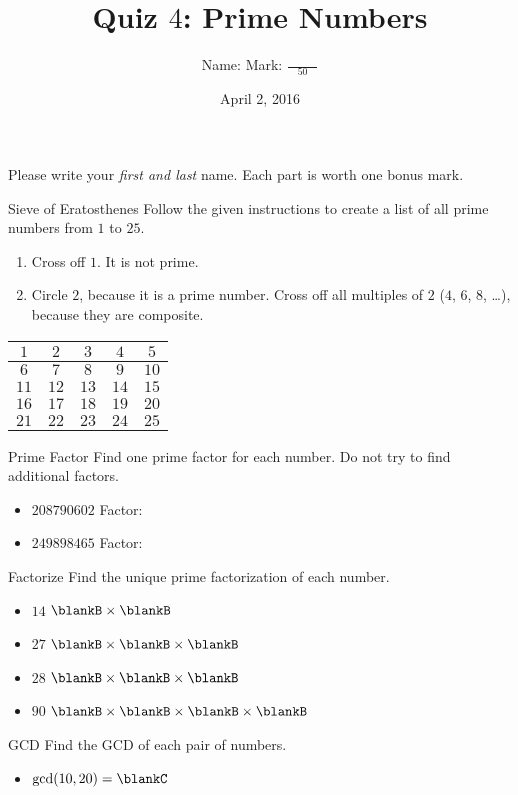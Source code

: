 \documentclass[12pt,letterpaper]{article}
\title{Quiz $4$: Prime Numbers}
\author{Name: \underline{\hspace{5cm}} Mark: $\displaystyle \frac{\hspace{3em}}{50}$}
\date{April 2, 2016}
\begin{document}
\maketitle

Please write your \emph{first and last} name. Each part is worth one bonus mark.

\thispagestyle{empty}

\begin{problem}{Sieve of Eratosthenes}
 Follow the given instructions to create a list of all prime numbers from $1$
 to $25$.

 \begin{enumerate}
  \item Cross off $1$. It is not prime.
  \item Circle $2$, because it is a prime number. Cross off all multiples of $2$
  ($4$, $6$, $8$, \dots), because they are composite.
 \end{enumerate}

 \begin{center}
  \begin{tabular}{|c|c|c|c|c|}
   \hline
   $1$ & $2$ & $3$ & $4$ & $5$ \\
   \hline
   $6$ & $7$ & $8$ & $9$ & $10$ \\
   \hline
   $11$ & $12$ & $13$ & $14$ & $15$ \\
   \hline
   $16$ & $17$ & $18$ & $19$ & $20$ \\
   \hline
   $21$ & $22$ & $23$ & $24$ & $25$ \\
   \hline
  \end{tabular}
 \end{center}
\end{problem}

\begin{problem}{Prime Factor}
 Find one prime factor for each number. Do not try to find additional factors.

 \begin{itemize}
  \item $208790602$ \hfill Factor: \blankB
  \item $249898465$ \hfill Factor: \blankB
 \end{itemize}

\end{problem}

\begin{problem}{Factorize}
 Find the unique prime factorization of each number.

 \begin{itemize}
  \item $14$ \hfill $\blankB \times \blankB$
  \item $27$ \hfill $\blankB \times \blankB \times \blankB$
  \item $28$ \hfill $\blankB \times \blankB \times \blankB$
  \item $90$ \hfill $\blankB \times \blankB \times \blankB \times \blankB$
 \end{itemize}
\end{problem}

\begin{problem}{GCD}
 Find the GCD of each pair of numbers.

 \begin{itemize}
  \item $\gcd(10, 20) = \blankC$
 \end{itemize}
\end{problem}
\end{document}
